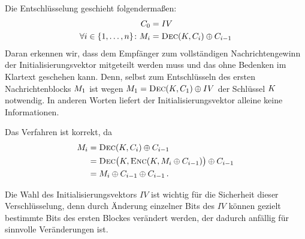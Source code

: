 Die Entschlüsselung geschieht folgendermaßen:
\begin{align*}
  C_0 &= IV\\
  \forall i \in \{1,\dots,n\}\colon M_i &= \textsc{Dec}(K, C_i) \oplus C_{i-1}
\end{align*}
Daran erkennen wir, dass dem Empfänger zum vollständigen
Nachrichtengewinn der Initialisierungsvektor \indexIV mitgeteilt werden
muss und das ohne Bedenken im Klartext geschehen kann. Denn, selbst zum
Entschlüsseln des ersten Nachrichtenblocks $M_{1}$ ist wegen
$M_{1} = \textsc{Dec}(K, C_{1}) \oplus IV$ der Schlüssel $K$
notwendig. In anderen Worten liefert der Initialisierungsvektor alleine
keine Informationen. 

Das Verfahren ist korrekt, da
\begin{align*}
  \begin{split}
    M_i &= \textsc{Dec}(K,C_i)\oplus C_{i-1}\\
    &= \textsc{Dec} \bigl(K,\textsc{Enc}(K,M_i\oplus C_{i-1})\bigr)
    \oplus C_{i-1}\\ 
    &= M_i\oplus C_{i-1}\oplus C_{i-1}\, .
  \end{split}
\end{align*}

Die Wahl des Initialisierungsvektors $IV$ \indexIV ist wichtig für die
Sicherheit dieser Verschlüsselung, denn durch Änderung einzelner Bits
des $IV$ können gezielt bestimmte Bits des ersten Blockes verändert
werden, der dadurch anfällig für sinnvolle Veränderungen ist.

